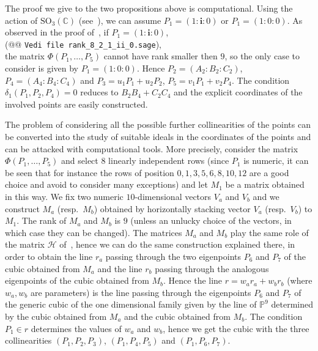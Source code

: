 \documentclass{amsart}
\theoremstyle{plain}
\theoremstyle{definition}
\newcommand{\iii}{\textbf{i}}
\begin{document}
The proof we give to the two propositions above is computational.
Using the action of $\mathrm{SO}_3(\mathbb{C})$ (see~),
we can assume $P_1= (1: \iii: 0)$ or $P_1= (1: 0: 0)$. As observed
in the proof of~, if $P_1 = (1: \iii: 0)$,\\
(@@ \verb+Vedi file rank_8_2_1_ii_0.sage+), \\
the matrix
$\Phi(P_1, \dots, P_5)$ cannot have rank smaller then $9$, so the only
case to consider is given by $P_1 = (1: 0: 0)$. Hence
$P_2 = (A_2: B_2: C_2)$, $P_4 = (A_4: B_4: C_4)$ and
$P_3 = u_1P_1+u_2P_2$, $P_5=v_1P_1+v_2P_4$.
The condition $\delta_1(P_1, P_2, P_4)=0$ reduces to $B_2B_4+C_2C_4$
and the explicit coordinates of the involved points are easily constructed.

The problem of considering all the possible further
collinearities of the points can be converted into the study of suitable
ideals in the coordinates of the points and can be attacked with
computational tools. More precisely,
consider the matrix $\Phi(P_1, \dots, P_5)$ and select $8$ linearly independent
rows (since $P_1$ is numeric, it can be seen that for instance the rows
of position $0, 1, 3, 5, 6, 8, 10, 12$ are a good choice and avoid to consider
many exceptions) and let $M_1$ be a matrix obtained in this way.
We fix two numeric $10$-dimensional vectors $V_a$ and $V_b$ and we construct
$M_a$ (resp.\ $M_b$) obtained by horizontally stacking vector
$V_a$ (resp.\ $V_b$)
to $M_1$. The rank of $M_a$ and $M_b$ is $9$ (unless an unlucky choice
of the vectors, in which case they can be changed). The matrices $M_a$ and
$M_b$ play the same role of the matrix $\mathcal{H}$
of~, hence we can do the same construction explained
there, in order to obtain the line $r_a$ passing through the two
eigenpoints $P_6$ and $P_7$ of the cubic obtained from $M_a$ and the
line $r_b$ passing through the analogous eigenpoints of the cubic
obtained from $M_b$.
Hence the line $r = w_ar_a+w_br_b$
(where $w_a, w_b$ are parameters) is the line passing through the eigenpoints
$P_6$ and $P_7$
of the generic cubic of the one dimensional family given by the line
of $\mathbb{P}^9$ determined by the cubic obtained from $M_a$ and
the cubic obtained from $M_b$. The condition $P_1 \in r$
determines the values of $w_a$ and $w_b$, hence we get the cubic
with the three collinearities $(P_1, P_2, P_3)$,
$(P_1, P_4, P_5)$ and $(P_1, P_6, P_7)$.
%
\end{document}
